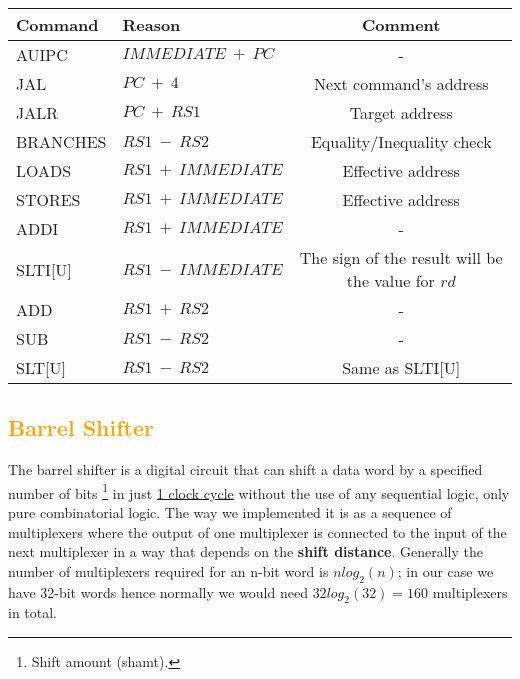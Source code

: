 	\vspace{2mm}
	\begin{threeparttable}[h!]
		
		\begin{tabular}{|l|l|c|} \hline
				\setrow{\bfseries}Command  &\setrow{\bfseries} Reason &\setrow{\bfseries} Comment \\\hline
				AUIPC    & $IMMEDIATE\ +\ PC$  & -\\\hline
				JAL   	 & $PC\ + \ 4 $  	   & {\footnotesize Next command's address }\\\hline
				JALR  	 & $PC\ + \ RS1$	   & {\footnotesize Target address } \\\hline 
				BRANCHES & $RS1\ - \ RS2$ 	   & {\footnotesize Equality/Inequality check }\\\hline
				LOADS 	 & $RS1\ + \ IMMEDIATE$& {\footnotesize Effective address}\\\hline
				STORES   & $RS1\ + \ IMMEDIATE$& {\footnotesize Effective address}\\\hline
				ADDI	 & $RS1\ + \ IMMEDIATE$& -\\\hline
				SLTI[U]  & $RS1\ - \ IMMEDIATE$& {\footnotesize The sign of the result will be the value for $rd$\footnotemark} \\\hline	 
				ADD 	 & $RS1\ + \ RS2$	   & -\\\hline
				SUB	 	 & $RS1\ - \ RS2$	   & -\\\hline
				SLT[U]	 & $RS1\ - \ RS2$	   & Same as SLTI[U] \\\hline
		\end{tabular}
		
		\label{Table 3.3}
		\vspace{5mm}
	\end{threeparttable}

	
	\subsection{\textcolor{orange}{Barrel Shifter}}
	\label{SubSec3.3.3:BARREL}
	
	The barrel shifter is a digital circuit that can shift a data word by a specified number of bits \footnote{Shift amount (shamt).} in just \underline{1 clock cycle} without the use of any sequential logic, only pure combinatorial logic. The way we implemented it is as a sequence of multiplexers where the output of one multiplexer is connected to the input of the next multiplexer in a way that depends on the \textbf{shift distance}. Generally the number of multiplexers required for an n-bit word is $nlog_{2}(n)$; in our case we have 32-bit words hence normally we would need $32log_{2}(32) = 160$ multiplexers in total. \\
	
